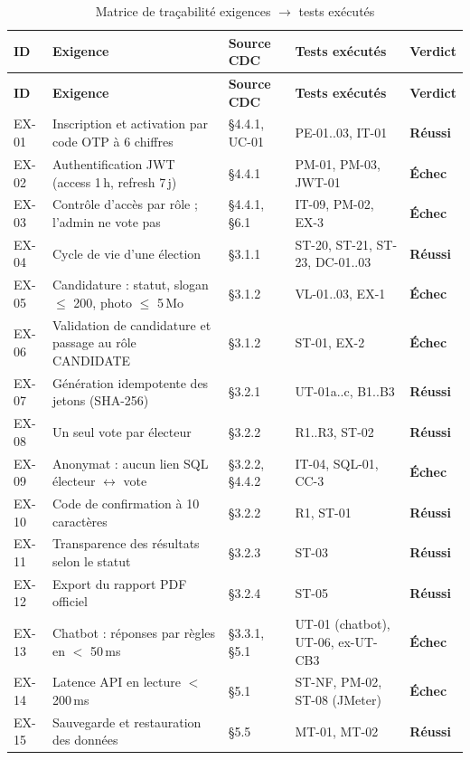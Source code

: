 \documentclass[12pt,a4paper]{report}
\newcommand{\ok}{\textcolor{okgreen}{\textbf{Réussi}}}
\newcommand{\ko}{\textcolor{kored}{\textbf{Échec}}}
\begin{document}
{\small
\begin{longtable}{@{}p{1.1cm}p{6.2cm}p{2cm}p{4.2cm}p{1.4cm}@{}}
\caption{Matrice de traçabilité exigences $\rightarrow$ tests exécutés}\label{tab:trace}\\
\toprule
\rowcolor{evlight}\textbf{ID} & \textbf{Exigence} & \textbf{Source CDC} & \textbf{Tests exécutés} & \textbf{Verdict}\\
\midrule \endfirsthead
\toprule
\rowcolor{evlight}\textbf{ID} & \textbf{Exigence} & \textbf{Source CDC} & \textbf{Tests exécutés} & \textbf{Verdict}\\
\midrule \endhead
\bottomrule \endlastfoot
EX-01 & Inscription et activation par code OTP à 6 chiffres & §4.4.1, UC-01 & PE-01..03, IT-01 & \ok\\
EX-02 & Authentification JWT (access 1\,h, refresh 7\,j) & §4.4.1 & PM-01, PM-03, JWT-01 & \ko\\
EX-03 & Contrôle d'accès par rôle ; l'admin ne vote pas & §4.4.1, §6.1 & IT-09, PM-02, EX-3 & \ko\\
EX-04 & Cycle de vie d'une élection & §3.1.1 & ST-20, ST-21, ST-23, DC-01..03 & \ok\\
EX-05 & Candidature : statut, slogan $\leq$ 200, photo $\leq$ 5\,Mo & §3.1.2 & VL-01..03, EX-1 & \ko\\
EX-06 & Validation de candidature et passage au rôle CANDIDATE & §3.1.2 & ST-01, EX-2 & \ko\\
EX-07 & Génération idempotente des jetons (SHA-256) & §3.2.1 & UT-01a..c, B1..B3 & \ok\\
EX-08 & Un seul vote par électeur & §3.2.2 & R1..R3, ST-02 & \ok\\
EX-09 & Anonymat : aucun lien SQL électeur $\leftrightarrow$ vote & §3.2.2, §4.4.2 & IT-04, SQL-01, CC-3 & \ko\\
EX-10 & Code de confirmation à 10 caractères & §3.2.2 & R1, ST-01 & \ok\\
EX-11 & Transparence des résultats selon le statut & §3.2.3 & ST-03 & \ok\\
EX-12 & Export du rapport PDF officiel & §3.2.4 & ST-05 & \ok\\
EX-13 & Chatbot : réponses par règles en $<$ 50\,ms & §3.3.1, §5.1 & UT-01 (chatbot), UT-06, ex-UT-CB3 & \ko\\
EX-14 & Latence API en lecture $<$ 200\,ms & §5.1 & ST-NF, PM-02, ST-08 (JMeter) & \ko\\
EX-15 & Sauvegarde et restauration des données & §5.5 & MT-01, MT-02 & \ok\\
\end{longtable}
}
\end{document}
